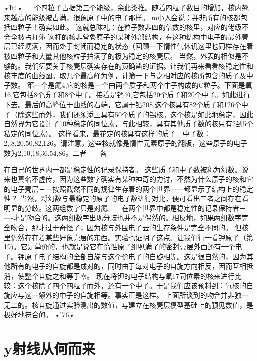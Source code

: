 •Ii4•
  
个四粒子占据第三个能级，余此类推。随着四粒子数目的增加，核内翘来越高的能级被占满，很象原子中的电子那样。
m小人会说：并非所有的核都包括四粒子！确实如此。
这就总昧礼：在粒子数非四的倍数的核里，对应的佬级不会全被占扛沁
这杆的核非常象原子的某种外部结构，在这种结构中电子的最外壳层已经埂满，因而处于封闭而稳定的状态（回顾一下惰性气休讥这里也同样存在着被四粒子和大量其他核粒子拍满了的极为稳定的核壳层。
当然，外表的相似是不够的。我们盓要关于核壳层确实存在的页确凿的证据。让我们再来看看核稳定性和核丰度的曲线图。取几个最高峰为例，计筛一下与之相对应的核所包含的质子及中子数。
笫一个是氮4,它的核是一个由两个质子和两个中子构成的C粒子。下面是氧16,它包括8个质子和8个中子。接着是钙40,它包括20个质子和20个中子。如此进行下去。最后的高峰位于曲线的右端，它属于铅208,这个核具有82个质子和126个中子（除这些而外，我们还须添上具有50个质子的锡核。这个核是如此地稳定，因此自然界为它设计了10种稳定的同位素，与此相较，具有其他质子数的核只有2到5个私定的同位素）。
这样看来，最花定的核具有这样的质子－中子数：2,.8,20,50,82,126。请注意，这些核就像是惰性元素原子的翻版，这些原子的电子数为2,10,18,36,54,86。二者——各

在自己的世界内一都是稳定性的记录保持者。
这些质子和中子数被称为幻数。说来也真名不虚传，因为这些数字确实有某种神奇的力讨，不然为什么原子的核和它的电子壳层－一按照截然不同的规律生存着的两个世界一一都显示了结构上的稳定性？
当然，将幻数与最稳定的原子的电子数进行对比，便可看出二者之间存在看明显的分歧。这两组数字只是对氮——在两个世界中都是稳定性的记录保持者－—-才是吻合的。这两组数字出现分歧也并不是偶然的。相反地，如果两组数字完全吻合，那才过于奇怪了，因为核与外围电子云的生存条件是完全不同的。
但核里仍然存在着某些好象壳层的东西。实验也证明了这点。让我们行一看钾原子（第19)。它是单价的，也就是说它在惰性原子组叭满了的密封壳层外面还有一个电子。钾原子电子结构的全部自旋与这个价电子的自旋相等。这是很自然的，因为其他所有的电子的自旋都是成对的，同时由于每对电子的自旋方向相反，因而互相抵消，使整个自旋之和等于零。
现在将钾的电子结构与氧17同位素的核来进行比较：这个核除了四个四粒子而外，还有一个中子。于是我们应该预料到：氧核的自旋应与这一额外的中子的自旋相等。事实正是这样。
上面所谈到的吻合并非独一无二的。核自旋通过实验测出的数值，与建立在核壳层模型基础上的预见数值，是极好地符合的。
•l76•
  
\section{y射线从何而来}

